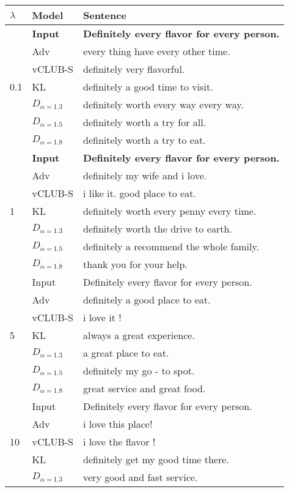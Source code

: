 \begin{longtable}[ht]{ll|l}
\hline
 $\lambda$ & Model	& Sentence	\\\hline
\multirow{7}{*}{0.1} &\textbf{Input}  &  	\textbf{Definitely every flavor for every person.} \\\hline
&Adv  & 	every thing have every other time.  \\
&vCLUB-S  & definitely very flavorful. \\
&KL  &  definitely a good time to visit. \\
&$D_{\alpha=1.3}$  &   definitely worth every way every way. \\
&$D_{\alpha=1.5}$  &  definitely worth a try for all. \\
&$D_{\alpha=1.8}$  & definitely worth a try to eat.  \\ \hline
\multirow{7}{*}{1} &\textbf{Input } &  \textbf{	Definitely every flavor for every person.} \\\hline
&Adv  & 	definitely my wife and i love.  \\
&vCLUB-S  & i like it. good place to eat. \\
&KL  &  definitely worth every penny every time. \\
&$D_{\alpha=1.3}$  &  	definitely worth the drive to earth. \\
&$D_{\alpha=1.5}$  & 	definitely a recommend the whole family.  \\
&$D_{\alpha=1.8}$  & thank you for your help.  \\\hline
\multirow{7}{*}{5} &Input  & 	Definitely every flavor for every person.  \\\hline
&Adv  &  	definitely a good place to eat. \\
&vCLUB-S  & i love it !  \\
&KL  &  	always a great experience. \\
&$D_{\alpha=1.3}$  & 	a great place to eat.  \\
&$D_{\alpha=1.5}$  & 	definitely my go - to spot.  \\
&$D_{\alpha=1.8}$  & great service and great food.  \\\hline
\multirow{7}{*}{10} &Input  & Definitely every flavor for every person.  \\\hline
&Adv  & i love this place!   \\
&vCLUB-S  & i love the flavor !  \\
&KL  & definitely get my good time there.  \\
&$D_{\alpha=1.3}$  & 	very good and fast service.  \\

\end{longtable}

